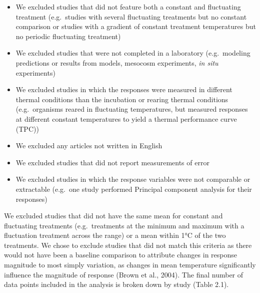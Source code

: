 \documentclass[12pt,twoside]{reedthesis}
\providecommand{\tightlist}{%
  \setlength{\itemsep}{0pt}\setlength{\parskip}{0pt}}
\begin{document}
\begin{itemize}
\tightlist
\item
  We excluded studies that did not feature both a constant and fluctuating treatment (e.g.~studies with several fluctuating treatments but no constant comparison or studies with a gradient of constant treatment temperatures but no periodic fluctuating treatment)
\item
  We excluded studies that were not completed in a laboratory (e.g.~modeling predictions or results from models, mesocosm experiments, \emph{in situ} experiments)
\item
  We excluded studies in which the responses were measured in different thermal conditions than the incubation or rearing thermal conditions (e.g.~organisms reared in fluctuating temperatures, but measured responses at different constant temperatures to yield a thermal performance curve (TPC))
\item
  We excluded any articles not written in English
\item
  We excluded studies that did not report measurements of error
\item
  We excluded studies in which the response variables were not comparable or extractable (e.g.~one study performed Principal component analysis for their responses)
\end{itemize}
We excluded studies that did not have the same mean for constant and fluctuating treatments (e.g.~treatments at the minimum and maximum with a fluctuation treatment across the range) or a mean within 1°C of the two treatments. We chose to exclude studies that did not match this criteria as there would not have been a baseline comparison to attribute changes in response magnitude to most simply variation, as changes in mean temperature significantly influence the magnitude of response (Brown et al., 2004). The final number of data points included in the analysis is broken down by study (Table 2.1).
\end{document}
